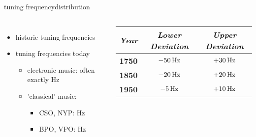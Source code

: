        \begin{frame}{tuning frequency}{distribution}
        \vspace{-5mm}
        \begin{columns}
            \begin{itemize}
                \item historic tuning frequencies
                \item<2-> tuning frequencies today
                    \begin{itemize}
                        \item   electronic music: often exactly \unit[440]{Hz}
                        \item   'classical' music:
                            \begin{itemize}
                                \item CSO, NYP: \unit[442]{Hz}
                                \item BPO, VPO: \unit[443]{Hz}
                            \end{itemize}
                    \end{itemize}
            \end{itemize}
            \begin{footnotesize}
           \begin{table}
            \begin{tabular}{lcc} %
                \\ \hline
                \bf{\emph{Year}}	 & \bf{\emph{Lower Deviation}}	 & \bf{\emph{Upper Deviation}}\\ 
                 \hline
                \bf{1750}	 & $-\unit[50]{Hz}$	 & $+\unit[30]{Hz}$\\
                \bf{1850}	 & $-\unit[20]{Hz}$	 & $+\unit[20]{Hz}$\\
                \bf{1950}	 & $-\unit[5]{Hz}$	 & $+\unit[10]{Hz}$\\
            \end{tabular}
            \end{table}
            \end{footnotesize}
            
        \end{columns}
        \end{frame}
        
